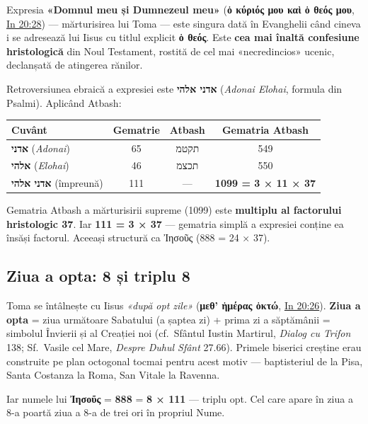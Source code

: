 \documentclass[12pt,a4paper,twoside,openany]{book}
\begin{document}
Expresia \textbf{«Domnul meu și Dumnezeul meu»} (\textbf{ὁ κύριός μου καὶ ὁ θεός μου}, \href{https://bibliaortodoxa.ro/carte.php?id=35\&cap=20\#28}{In 20:28}) --- mărturisirea lui Toma --- este singura dată în Evanghelii când cineva i se adresează lui Iisus cu titlul explicit \textbf{ὁ θεός}. Este \textbf{cea mai înaltă confesiune hristologică} din Noul Testament, rostită de cel mai «necredincios» ucenic, declanșată de atingerea rănilor.

Retroversiunea ebraică a expresiei este \textbf{אדני אלהי} (\textit{Adonai Elohai}, formula din Psalmi). Aplicând Atbash:

\begin{center}
\small
\begin{tabular}{lccc}
\toprule
\textbf{Cuvânt} & \textbf{Gematrie} & \textbf{Atbash} & \textbf{Gematria Atbash} \\
\midrule
\textbf{אדני} (\textit{Adonai}) & 65 & תקטמ & 549 \\
\textbf{אלהי} (\textit{Elohai}) & 46 & תכצמ & 550 \\
\textbf{אדני אלהי} (împreună) & 111 & --- & \textbf{1099 = 3 × 11 × 37} \\
\bottomrule
\end{tabular}
\end{center}

Gematria Atbash a mărturisirii supreme (1099) este \textbf{multiplu al factorului hristologic 37}. Iar \textbf{111 = 3 × 37} --- gematria simplă a expresiei conține ea însăși factorul. Aceeași structură ca Ἰησοῦς (888 = 24 × 37).

\subsection{Ziua a opta: 8 și triplu 8}

Toma se întâlnește cu Iisus \textit{«după opt zile»} (\textbf{μεθ' ἡμέρας ὀκτώ}, \href{https://bibliaortodoxa.ro/carte.php?id=35\&cap=20\#26}{In 20:26}). \textbf{Ziua a opta} = ziua următoare Sabatului (a șaptea zi) + prima zi a săptămânii = simbolul Învierii și al Creației noi (cf.\ Sfântul Iustin Martirul, \textit{Dialog cu Trifon} 138; Sf.\ Vasile cel Mare, \textit{Despre Duhul Sfânt} 27.66). Primele biserici creștine erau construite pe plan octogonal tocmai pentru acest motiv --- baptisteriul de la Pisa, Santa Costanza la Roma, San Vitale la Ravenna.

Iar numele lui \textbf{Ἰησοῦς} = \textbf{888} = \textbf{8 × 111} --- triplu opt. Cel care apare în ziua a 8-a poartă ziua a 8-a de trei ori în propriul Nume.
\end{document}
